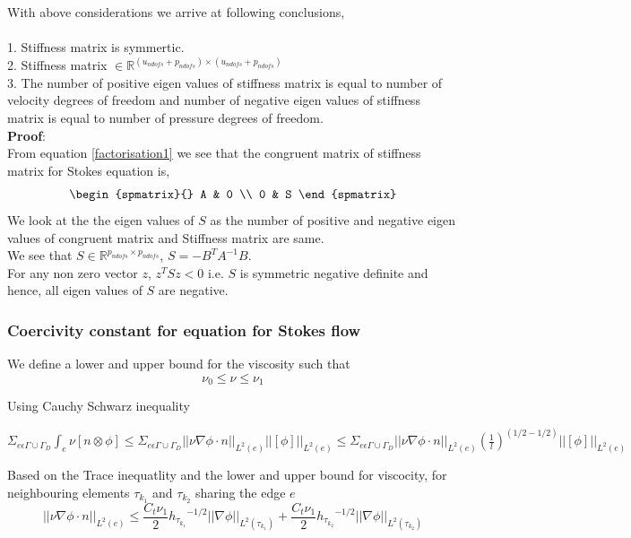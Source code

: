 \documentclass[a4paper,12pt]{book}
\begin{document}
With above considerations we arrive at following conclusions, \\
\\
1. Stiffness matrix is symmertic. \\
2. Stiffness matrix $ \in \mathbb{R}^{(u_{ndofs} + p_{ndofs}) \times (u_{ndofs} + p_{ndofs})}$\\
3. The number of positive eigen values of stiffness matrix is equal to number of velocity degrees of freedom and number of negative eigen values of stiffness matrix is equal to number of pressure degrees of freedom.\\
\textbf{Proof}:\\
From equation \eqref{factorisation1} we see that the congruent matrix of stiffness matrix for Stokes equation is,
\begin{equation}
\begin{spmatrix}{}
    A & 0 \\
    0 & S
\end{spmatrix}
\end{equation}
We look at the the eigen values of $S$ as the number of positive and negative eigen values of congruent matrix and Stiffness matrix are same.\\
We see that $S \in \mathbb{R}^{p_{ndofs} \times p_{ndofs}}$, $S = - B^T A^{-1} B$.\\ 
For any non zero vector $z$, $z^T S z < 0$ i.e. $S$ is symmetric negative definite and hence, all eigen values of $S$ are negative.

\subsubsection{Coercivity constant for equation for Stokes flow} \label{basics}

We define a lower and upper bound for the viscosity such that \\
\begin{equation}
\nu_0 \leq \nu \leq \nu_1
\end{equation}

Using Cauchy Schwarz inequality

$\Sigma_{e \epsilon \Gamma \cup \Gamma_D} \int_e {\nu}[n\otimes \phi] \leq \Sigma_{e \epsilon \Gamma \cup \Gamma_D} ||\nu \nabla \phi \cdot n||_{L^2(e)} ||[\phi]||_{L^2(e)} \leq \Sigma_{e \epsilon \Gamma \cup \Gamma_D} ||\nu \nabla \phi \cdot n||_{L^2(e)} (\frac{1}{l})^{(1/2-1/2)} ||[\phi]||_{L^2(e)}$

Based on the Trace inequatlity and the lower and upper bound for viscocity, for neighbouring elements $\tau_{k_1}$ and $\tau_{k_2}$ sharing the edge $e$ 
\begin{equation}
||{\nu \nabla \phi \cdot n}||_{L^2(e)} \leq \frac{C_t \nu_1}{2} {h_{\tau_{k_1}}}^{-1/2} ||\nabla \phi||_{L^2({\tau_{k_1}})} + \frac{C_t \nu_1}{2} {h_{{\tau_{k_2}}}}^{-1/2} ||\nabla \phi||_{L^2({\tau_{k_2}})}
\end{equation}
\end{document}
